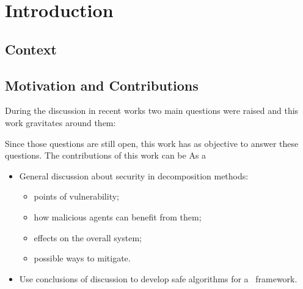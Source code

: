 \documentclass[../main.tex]{subfiles}
\begin{document}
\chapter{Introduction}\label{cha:introduction}
\minitoc

\section{Context}

\section{Motivation and Contributions}


During the discussion in recent works two main questions were raised and this work gravitates around them:

Since those questions are still open, this work has as objective to answer these questions.
The contributions of this work can be As a

\begin{itemize}
  \item General discussion about security in decomposition methods:
        \begin{itemize}[label=$\bullet$]
          \item points of vulnerability;
          \item how malicious agents can benefit from them;
          \item effects on the overall system;
          \item possible ways to mitigate.
        \end{itemize}
  \item Use conclusions of discussion to develop safe algorithms for a \dmpc\ framework.
\end{itemize}
\end{document}

